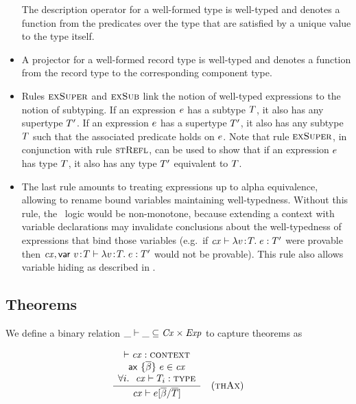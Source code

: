 \begin{itemize}
The description operator for a well-formed type is well-typed and denotes a
function from the predicates over the type that are satisfied by a unique
value to the type itself.
\item
A projector for a well-formed record type is well-typed and denotes a function
from the record type to the corresponding component type.
\item
Rules $\textsc{exSuper}$ and $\textsc{exSub}$ link the notion of well-typed expressions to the
notion of subtyping. If an expression $e$ has a subtype $T$, it also
has any supertype $T'$. If an expression $e$ has a supertype $T'$,
it also has any subtype $T$ such that the associated predicate holds on
$e$. Note that rule $\textsc{exSuper}$, in conjunction with rule $\textsc{stRefl}$, can
be used to show that if an expression $e$ has type $T$, it also has any
type $T'$ equivalent to $T$.
\item
The last rule amounts to treating expressions up to alpha equivalence,
allowing to rename bound variables maintaining well-typedness. Without this
rule, the \MS\ logic would be non-monotone, because extending a context with
variable declarations may invalidate conclusions about the well-typedness of
expressions that bind those variables (e.g.\ if $\mathit{cx}\vdash\lambda v\!:\!T.\;e:T'$ were
provable then $\mathit{cx},\mathsf{var}\ v\!:\!T\vdash\lambda v\!:\!T.\;e:T'$ would not be
provable). This rule also allows variable hiding as described in \cite{lm}.
\end{itemize}

\subsection{Theorems}

We define a binary relation $\_\vdash\_\subseteq\mathit{Cx}\times\mathit{Exp}$ to capture theorems
as

\[
\frac{\begin{array}{c}\vdash\mathit{cx}:\textsc{context}\\\mathsf{ax}\ \{\overline{\beta}\}\ e\in\mathit{cx}\\\forall i.\ \ \mathit{cx}\vdash T_i:\textsc{type}\end{array}}{\mathit{cx}\vdash e[\overline{\beta}/\overline{T}]}\quad\mbox{(\textsc{thAx})}
\]

